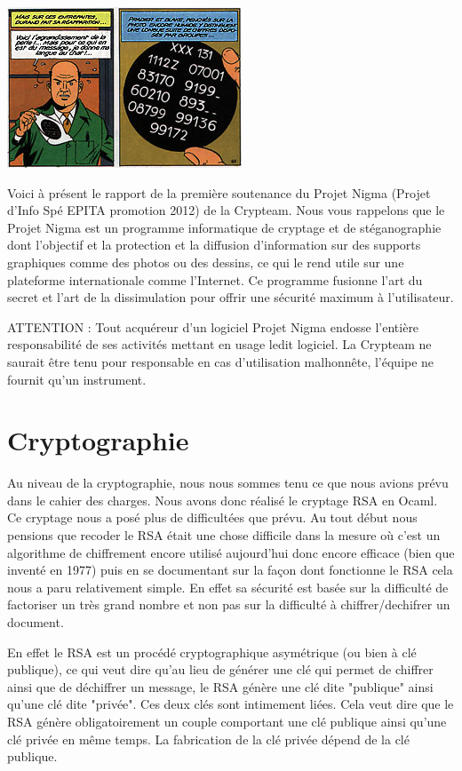 \documentclass[a4paper,12pt]{article}
\begin{document}
	\begin{center}	
		\includegraphics[scale=3]{meteores2.jpg}
	\end{center}
Voici à présent le rapport de la première soutenance du Projet Nigma (Projet d’Info Spé EPITA promotion 2012) de la Crypteam. Nous vous rappelons que le Projet Nigma est un programme informatique de cryptage et de stéganographie dont l’objectif et la protection et la diffusion d’information sur des supports graphiques comme des photos ou des dessins, ce qui le rend utile sur une plateforme internationale comme l’Internet. Ce programme fusionne l’art du secret et l’art de la dissimulation pour offrir une sécurité maximum à l’utilisateur.

ATTENTION : Tout acquéreur d’un logiciel Projet Nigma endosse l’entière responsabilité de ses activités mettant en usage ledit logiciel. La Crypteam ne saurait être tenu pour responsable en cas d’utilisation malhonnête, l’équipe ne fournit qu’un instrument.  

	\newpage
	\section{Cryptographie}
		Au niveau de la cryptographie, nous nous sommes tenu  ce que nous avions prévu dans le cahier des charges. Nous avons donc réalisé le cryptage RSA en Ocaml. Ce cryptage nous a posé plus de difficultées que prévu. Au tout début nous pensions que recoder le RSA était une chose difficile dans la mesure où c'est un algorithme de chiffrement encore utilisé aujourd'hui donc encore efficace (bien que inventé en 1977) puis en se documentant sur la façon dont fonctionne le RSA cela nous a paru relativement simple. En effet sa sécurité est basée sur la difficulté de factoriser un très grand nombre et non pas sur la difficulté à chiffrer/dechifrer un document.
		
		En effet le RSA est un procédé cryptographique asymétrique (ou bien à clé publique), ce qui veut dire qu'au lieu de générer une clé qui permet de chiffrer ainsi que de déchiffrer un message, le RSA génère une clé dite "publique" ainsi qu'une clé dite "privée". Ces deux clés sont intimement liées. Cela veut dire que le RSA génère obligatoirement un couple comportant une clé publique ainsi qu'une clé privée en même temps. La fabrication de la clé privée dépend de la clé publique. 
		
\end{document}
